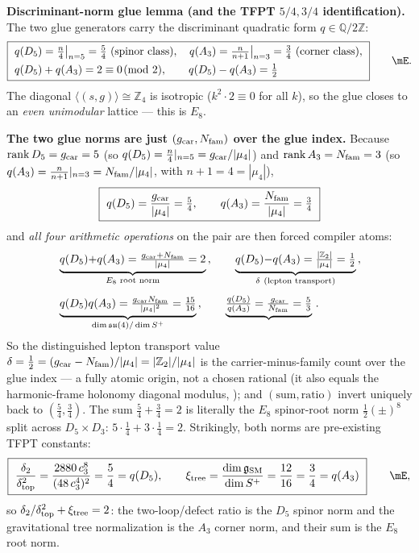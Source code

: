 \noindent\textbf{Discriminant-norm glue lemma (and the TFPT $5/4,3/4$ identification).} The two glue
generators carry the discriminant quadratic form $q\in\mathbb Q/2\mathbb Z$:
\begin{equation}
  \boxed{\ \begin{aligned}
    &q(D_5)=\tfrac{n}{4}\big|_{n=5}=\tfrac54\ (\text{spinor class}),\quad
    q(A_3)=\tfrac{n}{n+1}\big|_{n=3}=\tfrac34\ (\text{corner class}),\\
    &q(D_5)+q(A_3)=2\equiv0\!\!\pmod 2,\qquad q(D_5)-q(A_3)=\tfrac12
  \end{aligned}\ }\qquad\mE .
\end{equation}
The diagonal $\langle(s,g)\rangle\cong\mathbb Z_4$ is isotropic ($k^2\cdot2\equiv0$ for all $k$), so the
glue closes to an \emph{even unimodular} lattice --- this is $E_8$.

\textbf{The two glue norms are just $(g_{\mathrm{car}},N_{\mathrm{fam}})$ over the glue index.} Because $\operatorname{rank}D_5=g_{\mathrm{car}}=5$
(so $q(D_5)=\tfrac n4|_{n=5}=g_{\mathrm{car}}/|\mu_4|$) and $\operatorname{rank}A_3=N_{\mathrm{fam}}=3$
(so $q(A_3)=\tfrac{n}{n+1}|_{n=3}=N_{\mathrm{fam}}/|\mu_4|$, with $n{+}1=4=|\mu_4|$),
\[
  \boxed{\ q(D_5)=\frac{\gcar}{|\mu_4|}=\tfrac54,\qquad q(A_3)=\frac{\Nfam}{|\mu_4|}=\tfrac34\ }
\]
and \emph{all four arithmetic operations} on the pair are then forced compiler atoms:
\[
  \begin{aligned}
  &\underbrace{q(D_5){+}q(A_3)=\tfrac{\gcar+\Nfam}{|\mu_4|}=2}_{\text{$E_8$ root norm}}\,,\qquad
  \underbrace{q(D_5){-}q(A_3)=\tfrac{|\Z_2|}{|\mu_4|}=\tfrac12}_{\delta\ \text{(lepton transport)}}\,,\\[4pt]
  &\underbrace{q(D_5)q(A_3)=\tfrac{\gcar\Nfam}{|\mu_4|^2}=\tfrac{15}{16}}_{\dim\mathfrak{su}(4)/\dim S^+}\,,\qquad
  \underbrace{\tfrac{q(D_5)}{q(A_3)}=\tfrac{\gcar}{\Nfam}=\tfrac53}_{}\,.
  \end{aligned}
\]
So the distinguished lepton transport value $\delta=\tfrac12=(g_{\mathrm{car}}-N_{\mathrm{fam}})/|\mu_4|=|\mathbb{Z}_2|/|\mu_4|$ is the
carrier-minus-family count over the glue index --- a fully atomic origin, not a chosen rational (it also
equals the harmonic-frame holonomy diagonal modulus, ); and $(\text{sum},\text{ratio})$
invert uniquely back to $(\tfrac54,\tfrac34)$.  The sum $\tfrac54+\tfrac34=2$ is
literally the $E_8$ spinor-root norm $\tfrac12(\pm)^8$ split across $D_5\times D_3$:
$5\cdot\tfrac14+3\cdot\tfrac14=2$. Strikingly, both norms are pre-existing TFPT constants:
\begin{equation}
  \boxed{\ \frac{\dtwo}{\dtop^2}=\frac{2880\,\cthree^8}{(48\,\cthree^4)^2}=\frac54=q(D_5),\qquad
  \xi_{\mathrm{tree}}=\frac{\dimg}{\dim S^+}=\frac{12}{16}=\frac34=q(A_3)\ }\qquad\mE ,
\end{equation}
so $\delta_2/\delta_{\mathrm{top}}^2+\xi_{\mathrm{tree}}=2$: the two-loop/defect ratio is the $D_5$ spinor norm and the
gravitational tree normalization is the $A_3$ corner norm, and their sum is the $E_8$ root norm.

